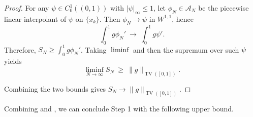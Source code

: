 \documentclass[12pt]{amsart}
\numberwithin{equation}{section}
\theoremstyle{remark}
\begin{document}
\begin{proof}
For any $\psi\in C_0^1((0,1))$ with $|\psi|_\infty\le1$, let $\phi_N\in\mathcal A_N$ be the piecewise linear interpolant of $\psi$ on $\{x_k\}$.
Then $\phi_N\to\psi$ in $W^{1,1}$, hence
\begin{equation}
\int_0^1 g\phi_N' \ \to\ \int_0^1 g\psi'.
\end{equation}
Therefore, $S_N\ge \int_0^1 g\phi_N'$. Taking $\liminf$ and then the supremum over such $\psi$ yields
\begin{equation}
\liminf_{N\to\infty} S_N \ \ge\ \|g\|_{\operatorname{TV}([0,1])}.
\end{equation}

Combining the two bounds gives $S_N\to \|g\|_{\operatorname{TV}([0,1])}$.
\end{proof}

Combining  and , we can conclude Step 1 with the following upper bound.
\end{document}
